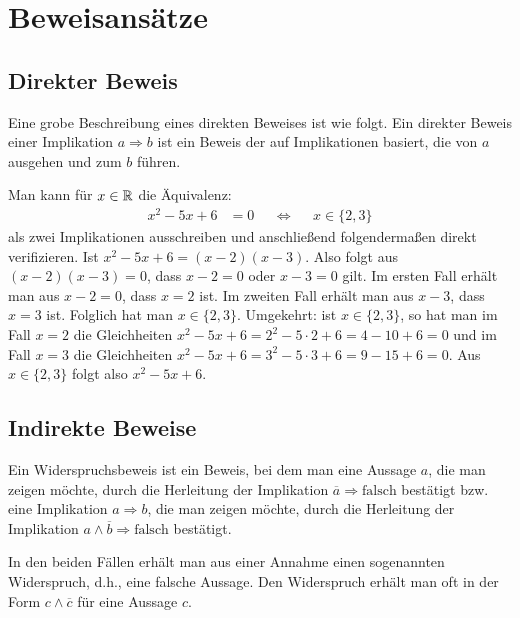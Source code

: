 \section{Beweisansätze} 

\subsection{Direkter Beweis} 

\begin{bem}
	Eine grobe Beschreibung eines direkten Beweises ist wie folgt. Ein direkter Beweis einer Implikation $a \Rightarrow b$ ist ein Beweis der auf Implikationen basiert, die von $a$ ausgehen und zum $b$ führen.
\end{bem} 

\begin{bem}
	Man kann für $x \in \mathbb{R}$ die Äquivalenz: 
	\begin{align*}
			x^2 - 5 x + 6 & = 0  &  & \Longleftrightarrow & & x \in \{2,3\}
	\end{align*} 
	als zwei Implikationen ausschreiben und anschließend 
	folgendermaßen direkt verifizieren. Ist $x^2 - 5 x + 6 = (x-2) (x-3)$. Also folgt aus $(x-2) (x-3)=0$, dass $x-2=0$ oder $x-3=0$ gilt. Im ersten Fall erhält man aus $x-2=0$, dass $x=2$ ist. Im zweiten Fall erhält man aus $x-3$, dass $x=3$ ist. Folglich hat man $x \in \{2,3\}$. Umgekehrt: ist $x \in \{2,3\}$, so hat man im Fall $x=2$ die Gleichheiten $x^2 - 5 x + 6= 2^2 - 5 \cdot 2 + 6 = 4- 10 + 6 =0$ und im Fall $x=3$ die Gleichheiten $x^2 - 5 x + 6 = 3^2 - 5 \cdot 3 + 6 = 9 - 15 + 6 = 0$. Aus $x \in \{2,3\}$ folgt also $x^2 - 5 x + 6$. 
\end{bem} 

\subsection{Indirekte Beweise} 


\begin{bem}
	Ein Widerspruchsbeweis ist ein Beweis, bei dem man eine Aussage $a$, die man zeigen möchte, durch die Herleitung der Implikation $\overline{a} \Rightarrow \text{falsch}$ bestätigt bzw. 
	eine Implikation $a \Rightarrow b$, die man zeigen möchte, durch die Herleitung der Implikation $a \wedge \overline{b} \Rightarrow \text{falsch}$ bestätigt. 
	
	In den beiden Fällen erhält man aus einer Annahme einen sogenannten Widerspruch, d.h., eine falsche Aussage. Den Widerspruch erhält man oft in der Form $c \wedge \overline{c}$ für eine Aussage $c$. 
\end{bem} 

